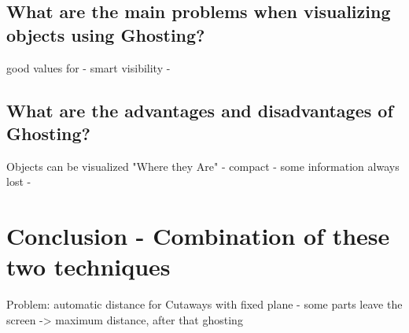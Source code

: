 \subsection{What are the main problems when visualizing objects using Ghosting?}
good values for \alpha - smart visibility - 

\subsection{What are the advantages and disadvantages of Ghosting?}
Objects can be visualized "Where they Are" - compact - some information always lost -
\section{Conclusion - Combination of these two techniques}
Problem: automatic distance for Cutaways with fixed plane - some parts leave the screen -> maximum distance, after that ghosting

